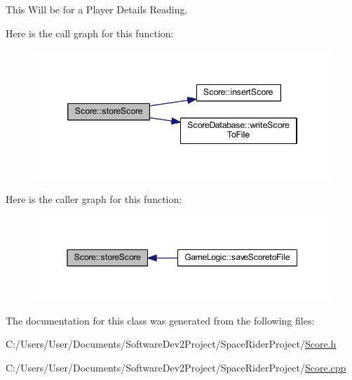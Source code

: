 This Will be for a Player Details Reading. 

Here is the call graph for this function\+:\nopagebreak
\begin{figure}[H]
\begin{center}
\leavevmode
\includegraphics[width=346pt]{class_score_a8cc9e62ee4d086c0f2e1b8ef6d2cbf8d_cgraph}
\end{center}
\end{figure}
Here is the caller graph for this function\+:\nopagebreak
\begin{figure}[H]
\begin{center}
\leavevmode
\includegraphics[width=350pt]{class_score_a8cc9e62ee4d086c0f2e1b8ef6d2cbf8d_icgraph}
\end{center}
\end{figure}


The documentation for this class was generated from the following files\+:\begin{DoxyCompactItemize}
\item 
C\+:/\+Users/\+User/\+Documents/\+Software\+Dev2\+Project/\+Space\+Rider\+Project/\hyperlink{_score_8h}{Score.\+h}\item 
C\+:/\+Users/\+User/\+Documents/\+Software\+Dev2\+Project/\+Space\+Rider\+Project/\hyperlink{_score_8cpp}{Score.\+cpp}\end{DoxyCompactItemize}
